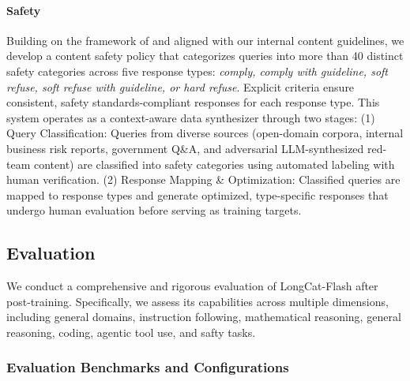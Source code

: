 \documentclass{article}
\newcommand{\longcat}{LongCat-Flash\xspace}
\begin{document}
\paragraph{Safety}
Building on the framework of \citet{rule_safety_nips} and aligned with our internal content guidelines, we develop a content safety policy that categorizes queries into more than 40 distinct safety categories across five response types: \textit{comply, comply with guideline, soft refuse, soft refuse with guideline, or hard refuse}. Explicit criteria ensure consistent, safety standards-compliant responses for each response type. This system operates as a context-aware data synthesizer through two stages: (1) Query Classification: Queries from diverse sources (open-domain corpora, internal business risk reports, government Q\&A, and adversarial LLM-synthesized red-team content) are classified into safety categories using automated labeling with human verification. (2) Response Mapping \& Optimization: Classified queries are mapped to response types and generate optimized, type-specific responses that undergo human evaluation before serving as training targets.

\subsection{Evaluation}
We conduct a comprehensive and rigorous evaluation of \longcat after post-training. Specifically, we assess its capabilities across multiple dimensions, including general domains, instruction following, mathematical reasoning, general reasoning, coding, agentic tool use, and safty tasks.

\subsubsection{Evaluation Benchmarks and Configurations}
\end{document}
